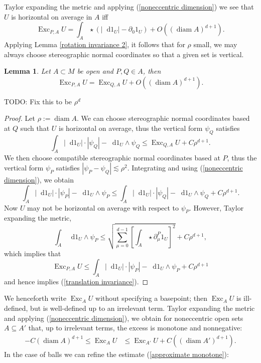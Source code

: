 \documentclass[reqno,10pt]{amsart}
\DeclareMathOperator{\diam}{diam}
\DeclareMathOperator{\Exc}{Exc}
\newcommand*\dif{\mathop{}\!\mathrm{d}}
\newtheorem{lemma}[theorem]{Lemma}
\theoremstyle{definition}
\numberwithin{equation}{section}
\begin{document}
Taylor expanding the metric and applying (\ref{noneccentric dimension}) we see that $U$ is horizontal on average in $A$ iff 
$$\Exc_{P, A} U = \int_A \star (|\dif 1_U| - \partial_0 1_U) + O((\diam A)^{d + 1}).$$
Applying Lemma \ref{rotation invariance 2}, it follows that for $\rho$ small, we may always choose stereographic normal coordinates so that a given set is vertical.

\begin{lemma}
Let $A \subset M$ be open and $P, Q \in A$, then
\begin{equation}\label{translation invariance}
\Exc_{P, A} U = \Exc_{Q, A} U + O((\diam A)^{d + 1}).
\end{equation}
\end{lemma}
TODO: Fix this to be $\rho^d$
\begin{proof}
Let $\rho := \diam A$.
We can choose stereographic normal coordinates based at $Q$ such that $U$ is horizontal on average, thus the vertical form $\psi_Q$ satisfies 
$$\int_A |\dif 1_U| \cdot |\psi_Q| - \dif 1_U \wedge \psi_Q \leq \Exc_{Q, A} U + C\rho^{d + 1}.$$
We then choose compatible stereographic normal coordinates based at $P$, thus the vertical form $\psi_P$ satisfies $|\psi_P - \psi_Q| \lesssim \rho^2$.
Integrating and using (\ref{noneccentric dimension}), we obtain 
$$\int_A |\dif 1_U| \cdot |\psi_P| - \dif 1_U \wedge \psi_P \leq \int_A |\dif 1_U| \cdot |\psi_Q| - \dif 1_U \wedge \psi_Q + C\rho^{d + 1}.$$
Now $U$ may not be horizontal on average with respect to $\psi_P$. However, Taylor expanding the metric,
$$\int_A \dif 1_U \wedge \psi_P \leq \sqrt{\sum_{\mu = 0}^{d - 1} \left[\int_A \star \partial^P_\mu 1_U\right]^2} + C\rho^{d + 1},$$
which implies that
$$\Exc_{P, A} U \leq \int_A |\dif 1_U| \cdot |\psi_P| - \dif 1_U \wedge \psi_P + C\rho^{d + 1}$$
and hence implies (\ref{translation invariance}).
\end{proof}

We henceforth write $\Exc_A U$ without specifying a basepoint; then $\Exc_A U$ is ill-defined, but is well-defined up to an irrelevant term.
Taylor expanding the metric and applying (\ref{noneccentric dimension}), we obtain for noneccentric open sets $A \subseteq A'$ that, up to irrelevant terms, the excess is monotone and nonnegative:
\begin{align}
-C(\diam A)^{d + 1} \leq \Exc_A U &\leq \Exc_{A'} U + C((\diam A')^{d + 1}). \label{approximate monotone}
\end{align}
In the case of balls we can refine the estimate (\ref{approximate monotone}):
\end{document}
